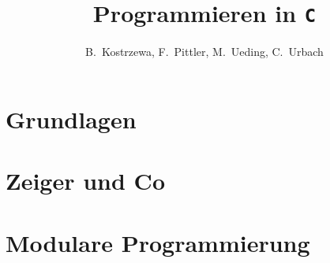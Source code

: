 \documentclass[12pt]{scrbook}
\title{Programmieren in \texttt{C}}                     \let\Title\@title
\author{B.~Kostrzewa, F.~Pittler, M.~Ueding, C.~Urbach} \let\Author\@author
\begin{document}
\maketitle

\tableofcontents

\clearpage
\chapter{Grundlagen}







\chapter{Zeiger und Co}





\chapter{Modulare Programmierung}


%
%


\printindex
\end{document}
